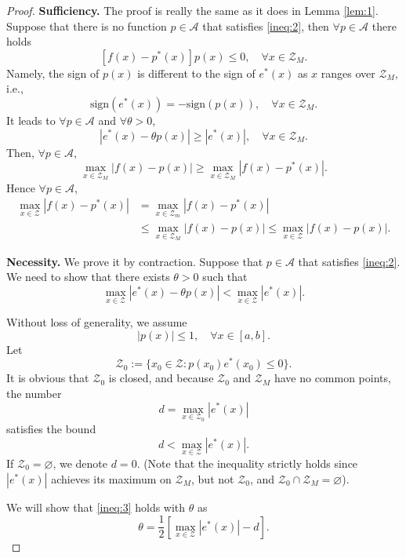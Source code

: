 \documentclass[11pt]{article}
\begin{document}
\begin{proof}
{\bf Sufficiency.} The proof is really the same as it does in Lemma \ref{lem:1}. Suppose that there is no function $p\in\mathscr{A}$ that satisfies \eqref{ineq:2}, then $\forall p\in\mathscr{A}$ there holds
\[
[f(x) - p^*(x)] p(x) \leqslant 0,\quad \forall x\in \mathscr{Z}_M.
\]
Namely, the sign of $p(x)$ is different to the sign of $e^*(x)$ as $x$ ranges over $\mathscr{Z}_M$, i.e.,
\[
\mathrm{sign}(e^*(x)) = -\mathrm{sign}(p(x)),\quad \forall x\in\mathscr{Z}_M.
\]
It leads to $\forall p\in\mathscr{A}$ and $\forall \theta>0$,
\[
|e^*(x) - \theta p(x)| \geqslant |e^*(x)|,\quad \forall x\in \mathscr{Z}_M.
\]
Then, $\forall p\in\mathscr{A}$,
\[
\max_{x\in\mathscr{Z}_M} |f(x) - p(x)| \geqslant \max_{x\in\mathscr{Z}_M} |f(x) - p^*(x)|.
\]
Hence $\forall p\in \mathscr{A}$,
\[
\begin{aligned}
\max_{x\in\mathscr{Z}} |f(x) - p^*(x)| & = \max_{x\in \mathscr{Z}_m} |f(x) - p^*(x)| \\ 
& \leqslant \max_{x\in\mathscr{Z}_M} |f(x) - p(x)| \leqslant \max_{x\in\mathscr{Z}} |f(x) - p(x)|.
\end{aligned}
\]

 {\bf Necessity.} We prove it by contraction. Suppose that $p\in \mathscr{A}$ that satisfies \eqref{ineq:2}. We need to show that there exists $\theta>0$ such that 
 \begin{equation}
 \max_{x\in\mathscr{Z}} |e^*(x) - \theta p(x)| < \max_{x\in \mathscr{Z}} |e^*(x)|.
 \label{ineq:3}
 \end{equation}
 
 Without loss of generality, we assume 
 \[
 |p(x)| \leqslant 1,\quad \forall x\in [a,b].
 \]
 Let
 \[
 \mathscr{Z}_0 := \{x_0\in\mathscr{Z}: p(x_0) e^*(x_0) \leqslant 0 \}.
 \]
 It is obvious that $\mathscr{Z}_0$ is closed, and because $\mathscr{Z}_0$ and $\mathscr{Z}_M$ have no common points, the number
\[
d = \max_{x\in\mathscr{Z}_0} |e^*(x)|
\]
satisfies the bound
\[
d < \max_{x\in \mathscr{Z}} |e^*(x)|.
\]
If $\mathscr{Z}_0=\varnothing$, we denote $d=0$. 
(Note that the inequality strictly holds since $|e^*(x)|$ achieves its maximum on $\mathscr{Z}_M$, but not $\mathscr{Z}_0$, and $\mathscr{Z}_0 \cap \mathscr{Z}_M = \varnothing$). 

We will show that \eqref{ineq:3} holds with $\theta$ as
\[
\theta = \frac{1}{2} \left [\max_{x\in\mathscr{Z}} |e^*(x)| - d \right ].
\]


\end{proof}
\end{document}
